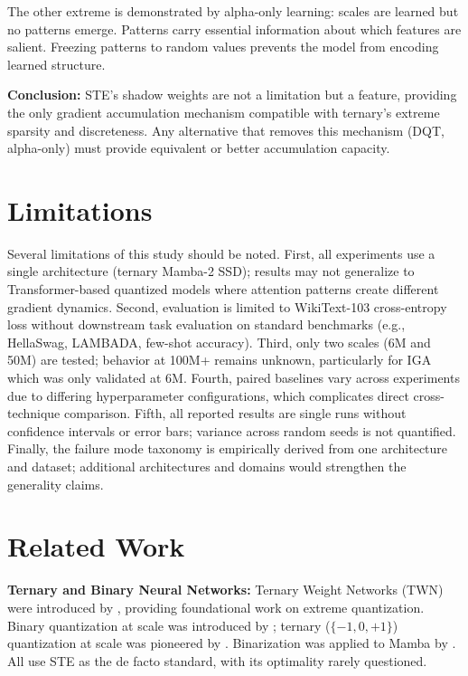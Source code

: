 \documentclass{article}
\begin{document}
The other extreme is demonstrated by alpha-only learning: scales are learned but no patterns emerge. Patterns carry essential information about which features are salient. Freezing patterns to random values prevents the model from encoding learned structure.

\textbf{Conclusion:} STE's shadow weights are not a limitation but a feature, providing the only gradient accumulation mechanism compatible with ternary's extreme sparsity and discreteness. Any alternative that removes this mechanism (DQT, alpha-only) must provide equivalent or better accumulation capacity.

\section{Limitations}

Several limitations of this study should be noted. First, all experiments use a single architecture (ternary Mamba-2 SSD); results may not generalize to Transformer-based quantized models where attention patterns create different gradient dynamics. Second, evaluation is limited to WikiText-103 cross-entropy loss without downstream task evaluation on standard benchmarks (e.g., HellaSwag, LAMBADA, few-shot accuracy). Third, only two scales (6M and 50M) are tested; behavior at 100M+ remains unknown, particularly for IGA which was only validated at 6M. Fourth, paired baselines vary across experiments due to differing hyperparameter configurations, which complicates direct cross-technique comparison. Fifth, all reported results are single runs without confidence intervals or error bars; variance across random seeds is not quantified. Finally, the failure mode taxonomy is empirically derived from one architecture and dataset; additional architectures and domains would strengthen the generality claims.

\section{Related Work}

\textbf{Ternary and Binary Neural Networks:} Ternary Weight Networks (TWN) were introduced by \citet{li2016ternary}, providing foundational work on extreme quantization. Binary quantization at scale was introduced by \citet{wang2023bitnet}; ternary ($\{-1, 0, +1\}$) quantization at scale was pioneered by \citet{ma2024era}. Binarization was applied to Mamba by \citet{bimamba2024}. All use STE as the de facto standard, with its optimality rarely questioned.
\end{document}
